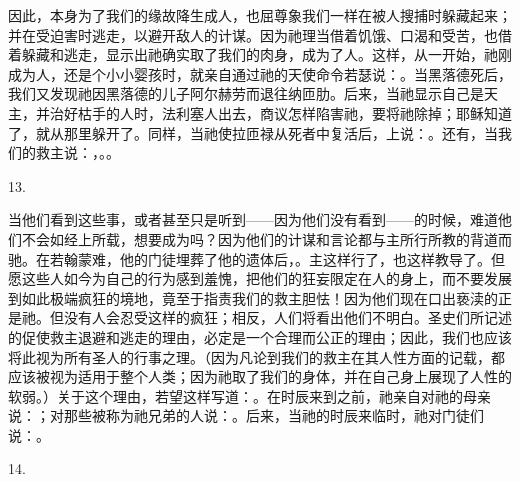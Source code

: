 因此，本身为了我们的缘故降生成人，也屈尊象我们一样在被人搜捕时躲藏起来；并在受迫害时逃走，以避开敌人的计谋。因为祂理当借着饥饿、口渴和受苦，也借着躲藏和逃走，显示出祂确实取了我们的肉身，成为了人。这样，从一开始，祂刚成为人，还是个小小婴孩时，就亲自通过祂的天使命令若瑟说：。当黑落德死后，我们又发现祂因黑落德的儿子阿尔赫劳而退往纳匝肋。后来，当祂显示自己是天主，并治好枯手的人时，法利塞人出去，商议怎样陷害祂，要将祂除掉；耶稣知道了，就从那里躲开了。同样，当祂使拉匝禄从死者中复活后，上说：。还有，当我们的救主说：，。。\par

13. \par

当他们看到这些事，或者甚至只是听到——因为他们没有看到——的时候，难道他们不会如经上所载，想要成为吗？因为他们的计谋和言论都与主所行所教的背道而驰。在若翰蒙难，他的门徒埋葬了他的遗体后，。主这样行了，也这样教导了。但愿这些人如今为自己的行为感到羞愧，把他们的狂妄限定在人的身上，而不要发展到如此极端疯狂的境地，竟至于指责我们的救主胆怯！因为他们现在口出亵渎的正是祂。但没有人会忍受这样的疯狂；相反，人们将看出他们不明白。圣史们所记述的促使救主退避和逃走的理由，必定是一个合理而公正的理由；因此，我们也应该将此视为所有圣人的行事之理。（因为凡论到我们的救主在其人性方面的记载，都应该被视为适用于整个人类；因为祂取了我们的身体，并在自己身上展现了人性的软弱。）关于这个理由，若望这样写道：。在时辰来到之前，祂亲自对祂的母亲说：；对那些被称为祂兄弟的人说：。后来，当祂的时辰来临时，祂对门徒们说：。\par

14. \par

